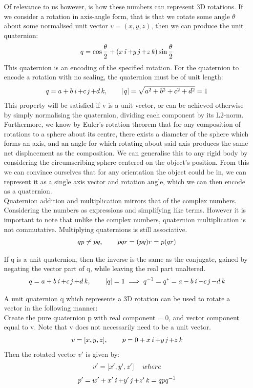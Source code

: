Of relevance to us however, is how these numbers can represent 3D rotations. If we consider a rotation in axis-angle form, that is that we rotate some angle $\theta$ about some normalised unit vector $v = (x,y,z)$, then we can produce the unit quaternion:
$$q = \cos{\frac{\theta}{2}} + (x\operatorname{\mathit{i}} + y\operatorname{\mathit{j}} + z\operatorname{\mathit{k}}) \sin{\frac{\theta}{2}}$$
This quaternion is an encoding of the specified rotation. For the quaternion to encode a rotation with no scaling, the quaternion must be of unit length:
$$q = a + b\operatorname{\mathit{i}} + c\operatorname{\mathit{j}} + d\operatorname{\mathit{k}}, \operatorname{\operatorname{\: \: \: \:} \operatorname{\: \: \: \:}} |q| = \sqrt{a^2 + b^2 + c^2 + d^2} = 1$$
This property will be satisfied if v is a unit vector, or can be achieved otherwise by simply normalising the quaternion, dividing each component by its L2-norm.\\

Furthermore, we know by Euler's rotation theorem \cite{euler-theorem} that for any composition of rotations to a sphere about its centre, there exists a diameter of the sphere which forms an axis, and an angle for which rotating about said axis produces the same net displacement as the composition. We can generalise this to any rigid body by considering the circumscribing sphere centered on the object's position. From this we can convince ourselves that for any orientation the object could be in, we can represent it as a single axis vector and rotation angle, which we can then encode as a quaternion.\\

Quaternion addition and multiplication mirrors that of the complex numbers. Considering the numbers as expressions and simplifying like terms. However it is important to note that unlike the complex numbers, quaternion multiplication is not commutative. Multiplying quaternions is still associative.
$$qp \neq pq, \operatorname{\operatorname{\: \: \: \:} \operatorname{\: \: \: \:}} pqr = (pq)r = p(qr)$$

If q is a unit quaternion, then the inverse is the same as the conjugate, gained by negating the vector part of q, while leaving the real part unaltered.
$$ q = a + b\operatorname{\mathit{i}} + c\operatorname{\mathit{j}} + d\operatorname{\mathit{k}}, \operatorname{\operatorname{\: \: \: \:} \operatorname{\: \: \: \:}} |q| = 1 \implies q^{-1} = q^* = a - b\operatorname{\mathit{i}} - c\operatorname{\mathit{j}} - d\operatorname{\mathit{k}}$$

A unit quaternion q which represents a 3D rotation can be used to rotate a vector in the following manner:\\
Create the pure quaternion p with real component = 0, and vector component equal to v. Note that v does not necessarily need to be a unit vector.
$$v = [x,y,z], \operatorname{\operatorname{\: \: \: \:} \operatorname{\: \: \: \:}} p = 0 + x\operatorname{\mathit{i}} + y\operatorname{\mathit{j}} + z\operatorname{\mathit{k}} $$
Then the rotated vector $v'$ is given by:
$$v' = [x', y', z'] \operatorname{\: \: \: \:} where$$
$$p' = w' + x'\operatorname{\mathit{i}} + y'\operatorname{\mathit{j}} + z'\operatorname{\mathit{k}} = qpq^{-1}$$

